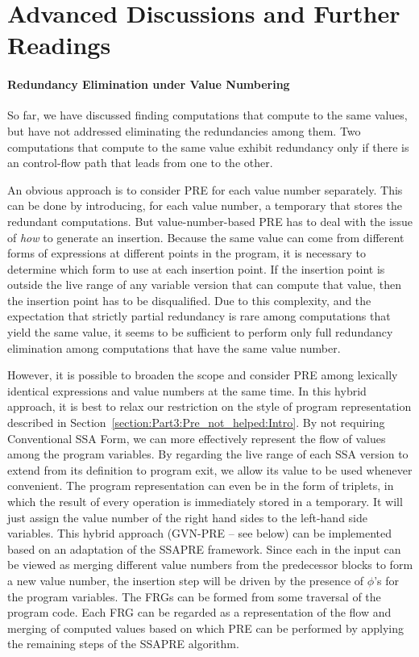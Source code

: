 \section{Advanced Discussions and Further Readings}
\paragraph{Redundancy Elimination under Value Numbering}
So far, we have discussed finding computations that compute to the same values, but have not addressed eliminating the redundancies among them. 
Two computations that compute to the same value exhibit redundancy only if there is an control-flow path that leads from one to the other.

An obvious approach is to consider PRE for each value number separately. 
This can be done by introducing, for each value number, a temporary that stores the redundant computations.
But value-number-based PRE has to deal with the issue of \emph{how} to generate an insertion. 
Because the same value can come from different forms of expressions at different points in the program, it is necessary to determine which form to use at each insertion point. 
If the insertion point is outside the live range of any variable version that can compute that value, then the insertion point has to be disqualified. 
Due to this complexity, and the expectation that strictly partial redundancy is rare among computations that yield the same value, it seems to be sufficient to perform only full redundancy elimination among computations that have the same value number.

However, it is possible to broaden the scope and consider PRE among lexically identical expressions and value numbers at the same time. 
In this hybrid approach, it is best to relax our restriction on the style of program representation described in Section~\ref{section:Part3:Pre_not_helped:Intro}. 
By not requiring Conventional SSA Form, we can more effectively represent the flow of values among the program variables. 
By regarding the live range of each SSA version to extend from its definition to program exit, we allow its value to be used whenever convenient. 
The program representation can even be in the form of triplets, in which the result of every operation is immediately stored in a temporary. 
It will just assign the value number of the right hand sides to the left-hand side variables.
This hybrid approach (GVN-PRE -- see below) can be implemented based on an adaptation of the SSAPRE framework. 
Since each \phifun in the input can be viewed as merging different value numbers from the predecessor blocks to form a new value number, the \PHIfun insertion step will be driven by the presence of $\phi$'s for the program variables. 
The FRGs can be formed from some traversal of the program code. 
Each FRG can be regarded as a representation of the flow and merging of computed values based on which PRE can be performed by applying the remaining steps of the SSAPRE algorithm.


